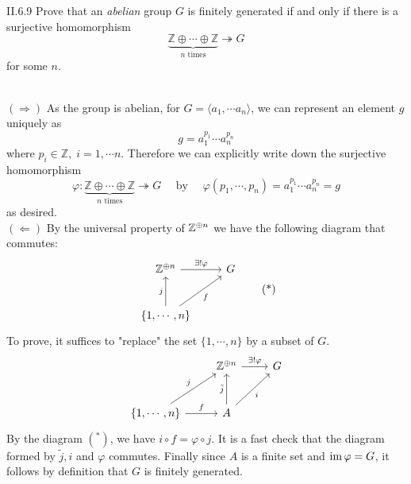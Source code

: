 \begin{problem}{II.6.9}
Prove that an \emph{abelian} group $G$ is finitely generated if and only if there is a surjective homomorphism
\[
    \underbrace{\mathbb{Z} \oplus \cdots \oplus \mathbb{Z}}_{n \text{ times}}\twoheadrightarrow G   
\]
for some $n$.
\end{problem}
\begin{pf} \\
$(\Rightarrow)$ As the group is abelian, for $G = \langle a_1, \cdots a_n \rangle$, we can represent an element $g$ uniquely as
\[
    g = a_1^{p_1} \cdots a_n^{p_n}    
\]
where $p_i\in \mathbb{Z}, \; i = 1, \cdots n$. Therefore we can explicitly write down the surjective homomorphism
\[
\varphi : \underbrace{\mathbb{Z} \oplus \cdots \oplus \mathbb{Z}}_{n \text{ times}}\twoheadrightarrow G \quad \text{ by } \quad \varphi(p_1,\cdots ,p_n) = a_1^{p_1} \cdots a_n^{p_n} = g      
\]
as desired. \\
$(\Leftarrow)$ By the universal property of $\mathbb{Z}^{\oplus n}$ we have the following diagram that commutes:
\[
\begin{tikzcd}[row sep=large]
\Z^{\oplus n} \arrow[r, "\exists ! \varphi"] &G \\
\{1,\cdots,n\} \arrow[u, "j"] \arrow[ur, "f"']
\end{tikzcd}
\tag{*} 
\]
To prove, it suffices to "replace" the set $\{1,\cdots,n\}$ by a subset of $G$.
\[
\begin{tikzcd}[row sep=large]
& \Z^{\oplus n} \arrow[r, "\exists ! \varphi"] & G \\
{\{1,\cdots,n\}} \arrow[r, "f"] \arrow[ru, "j"] & A \arrow[u, "\tilde{j}"] \arrow[ru, "i"']    &  
\end{tikzcd}
\]
By the diagram $(^*)$, we have $i \circ f = \varphi \circ j$. It is a fast check that the diagram formed by $\tilde{j}, i$ and $\varphi$ commutes. Finally since $A$ is a finite set and $\operatorname{im} \varphi = G$, it follows by definition that $G$ is finitely generated.
\end{pf}

